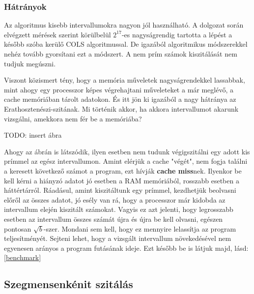 \documentclass[twoside, a4paper, 12pt]{article}
\begin{document}
 \subsubsection{Hátrányok} \label{badbad}
Az algoritmus kisebb intervallumokra nagyon jól használható. A dolgozat során elvégzett mérések szerint körülbelül $2^17$-es nagyságrendig tartotta a lépést a később szóba kerülő COLS algoritmussal. De igazából algoritmikus módszerekkel nehéz tovább gyorsítani ezt a módszert. A nem prím számok kiszitálását nem tudjuk megúszni. \par
Viszont közismert tény, hogy a memória műveletek nagyságrendekkel lassabbak, mint ahogy egy processzor képes végrehajtani műveleteket a már meglévő, a cache memóriában tárolt adatokon. És itt jön ki igazából a nagy hátránya az Erathosztenészi-szitának. Mi történik akkor, ha akkora intervallumot akarunk vizsgálni, amekkora nem fér be a memóriába? \par
TODO: insert ábra \par
Ahogy az ábrán is látszódik, ilyen esetben nem tudunk végigszitálni egy adott kis prímmel az egész intervallumon. Amint elérjük a cache "végét", nem fogja találni a keresett következő számot a program, ezt hívják \textbf{cache miss}nek. Ilyenkor be kell kérni a hiányzó adatot jó esetben a RAM memóriából, rosszabb esetben a háttértárról. Ráadásul, amint kiszitáltunk egy prímmel, kezdhetjük beolvasni előről az összes adatot, jó esély van rá, hogy a processzor már kidobda az intervallum elején kiszitált számokat. Vagyis ez azt jelenti, hogy legrosszabb esetben az intervallum összes számát újra és újra be kell olvasni, egészen pontosan $\sqrt{b}$-szer. Mondani sem kell, hogy ez mennyire lelassítja az program teljesítményét. Sejteni lehet, hogy a vizsgált intervallum növekedésével nem egyenesen arányos a program futásának ideje. Ezt később be is látjuk majd, lásd: \ref{benchmark}

\subsection{Szegmensenkénit szitálás}
\end{document}
